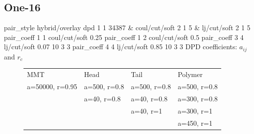 \documentclass[a4paper]{article}
\begin{document}
\subsection*{One-16}
pair\_style hybrid/overlay dpd 1 1 34387 \& coul/cut/soft 2 1 5 \& 
lj/cut/soft 2 1 5\newline
pair\_coeff 1 1 coul/cut/soft 0.25
pair\_coeff 1 2 coul/cut/soft 0.5\newline
pair\_coeff 3 4 lj/cut/soft 0.07    10 3 3\newline
pair\_coeff 4 4 lj/cut/soft 0.85    10 3 3\newline
DPD coefficients: $a_{ij}$ and $r_c$
\begin{figure}[H]\begin{tabular}{llll}
MMT             & Head         & Tail         & Polymer      \\
a=50000, r=0.95 & a=500, r=0.8 & a=500, r=0.8 & a=500, r=0.8 \\
                & a=40,  r=0.8 & a=40,  r=0.8 & a=300, r=0.8 \\
                &              & a=40,  r=1   & a=300, r=1   \\
                &              &              & a=450, r=1   \\
\end{tabular}\end{figure}
\end{document}
